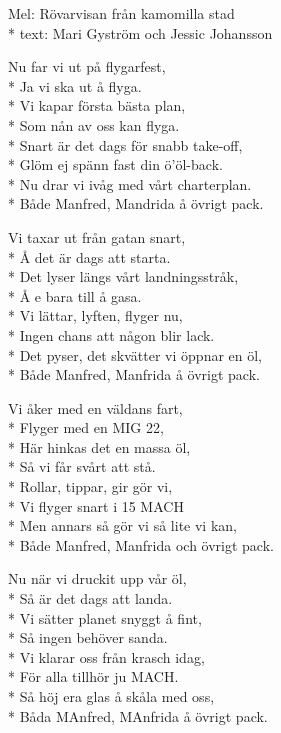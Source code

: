 \begin{SongText}[Flygturen]
    \begin{SongInfo}
        Mel: Rövarvisan från kamomilla stad\\*%
        text: Mari Gyström och Jessic Johansson
    \end{SongInfo}
    \begin{SongVerse}
        Nu far vi ut på flygarfest,\\*%
        Ja vi ska ut å flyga.\\*%
        Vi kapar första bästa plan,\\*%
        Som nån av oss kan flyga.\\*%
        Snart är det dags för snabb take-off,\\*%
        Glöm ej spänn fast din ö'öl-back.\\*%
        Nu drar vi ivåg med vårt charterplan.\\*%
        Både Manfred, Mandrida å övrigt pack.
    \end{SongVerse}
    \begin{SongVerse}
        Vi taxar ut från gatan snart,\\*%
        Å det är dags att starta.\\*%
        Det lyser längs vårt landningsstråk,\\*%
        Å e bara till å gasa.\\*%
        Vi lättar, lyften, flyger nu,\\*%
        Ingen chans att någon blir lack.\\*%
        Det pyser, det skvätter vi öppnar en öl,\\*%
        Både Manfred, Manfrida å övrigt pack.
    \end{SongVerse}
    \begin{SongVerse}
        Vi åker med en väldans fart,\\*%
        Flyger med en MIG 22,\\*%
        Här hinkas det en massa öl,\\*%
        Så vi får svårt att stå.\\*%
        Rollar, tippar, gir gör vi,\\*%
        Vi flyger snart i 15 MACH\\*%
        Men annars så gör vi så lite vi kan,\\*%
        Både Manfred, Manfrida och övrigt pack.
    \end{SongVerse}
    \begin{SongVerse}
        Nu när vi druckit upp vår öl,\\*%
        Så är det dags att landa.\\*%
        Vi sätter planet snyggt å fint,\\*%
        Så ingen behöver sanda.\\*%
        Vi klarar oss från krasch idag,\\*%
        För alla tillhör ju MACH.\\*%
        Så höj era glas å skåla med oss,\\*%
        Båda MAnfred, MAnfrida å övrigt pack.
    \end{SongVerse}
\end{SongText}
